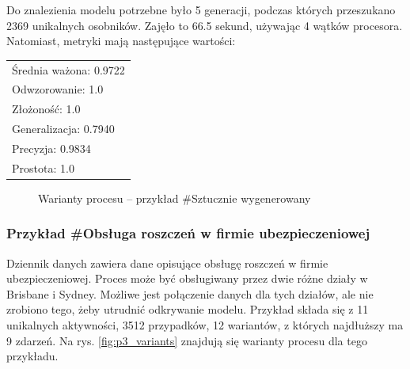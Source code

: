 Do znalezienia modelu potrzebne było 5 generacji, podczas których przeszukano 2369 unikalnych osobników. Zajęło to 66.5 sekund, używając 4 wątków procesora. Natomiast, metryki mają następujące wartości: 

 \begin{center}
  \begin{tabular}{l}
	Średnia ważona: 0.9722 \\
	Odwzorowanie: 1.0 \\
	Złożoność: 1.0 \\
	Generalizacja: 0.7940 \\
	Precyzja: 0.9834 \\
	Prostota: 1.0
  \end{tabular}
 \end{center}
 
\begin{figure}[H]
	\caption{\label{fig:p2_chart}Warianty procesu -- przykład \#Sztucznie wygenerowany}
\end{figure}

\subsubsection{Przykład \#Obsługa roszczeń w firmie ubezpieczeniowej}
Dziennik danych zawiera dane opisujące obsługę roszczeń w firmie ubezpieczeniowej. Proces może być obsługiwany przez dwie różne działy w Brisbane i Sydney. Możliwe jest połączenie danych dla tych działów, ale nie zrobiono tego, żeby utrudnić odkrywanie modelu.
Przykład składa się z 11 unikalnych aktywności, 3512 przypadków, 12 wariantów, z których najdłuższy ma 9 zdarzeń. Na rys. \ref{fig:p3_variants} znajdują się warianty procesu dla tego przykładu.


